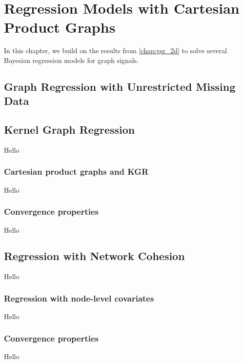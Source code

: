 \chapter{Regression Models with Cartesian Product Graphs}


\label{chap:kgr_rnc_2d}

In this chapter, we build on the results from \cref{chap:gsr_2d} to solve several Bayesian regression models for graph signals. 

\section{Graph Regression with Unrestricted Missing Data}

\section{Kernel Graph Regression}

\label{sec:kgr_mdp}

Hello

\subsection{Cartesian product graphs and KGR}

Hello

\subsection{Convergence properties}

Hello


\section{Regression with Network Cohesion}

\label{sec:rnc_mdp}

Hello

\subsection{Regression with node-level covariates}

Hello

\subsection{Convergence properties}

Hello